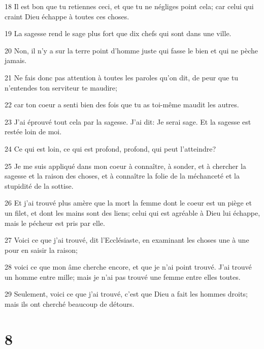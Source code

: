 \par 18 Il est bon que tu retiennes ceci, et que tu ne négliges point cela; car celui qui craint Dieu échappe à toutes ces choses.
\par 19 La sagesse rend le sage plus fort que dix chefs qui sont dans une ville.
\par 20 Non, il n'y a sur la terre point d'homme juste qui fasse le bien et qui ne pèche jamais.
\par 21 Ne fais donc pas attention à toutes les paroles qu'on dit, de peur que tu n'entendes ton serviteur te maudire;
\par 22 car ton coeur a senti bien des fois que tu as toi-même maudit les autres.
\par 23 J'ai éprouvé tout cela par la sagesse. J'ai dit: Je serai sage. Et la sagesse est restée loin de moi.
\par 24 Ce qui est loin, ce qui est profond, profond, qui peut l'atteindre?
\par 25 Je me suis appliqué dans mon coeur à connaître, à sonder, et à chercher la sagesse et la raison des choses, et à connaître la folie de la méchanceté et la stupidité de la sottise.
\par 26 Et j'ai trouvé plus amère que la mort la femme dont le coeur est un piège et un filet, et dont les mains sont des liens; celui qui est agréable à Dieu lui échappe, mais le pécheur est pris par elle.
\par 27 Voici ce que j'ai trouvé, dit l'Ecclésiaste, en examinant les choses une à une pour en saisir la raison;
\par 28 voici ce que mon âme cherche encore, et que je n'ai point trouvé. J'ai trouvé un homme entre mille; mais je n'ai pas trouvé une femme entre elles toutes.
\par 29 Seulement, voici ce que j'ai trouvé, c'est que Dieu a fait les hommes droits; mais ils ont cherché beaucoup de détours.

\chapter{8}

